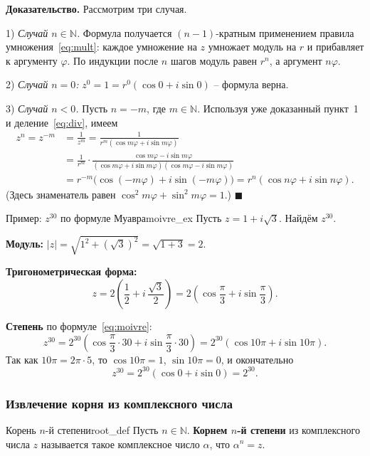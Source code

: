 \documentclass[12pt,a4paper]{article}
\newenvironment{myproof}{\noindent\textbf{Доказательство.}}{\hfill$\blacksquare$}
\begin{document}
\begin{myproof}
  Рассмотрим три случая.

1) \textit{Случай $n \in \mathbb{N}$.} Формула получается
$(n-1)$-кратным применением правила умножения~\eqref{eq:mult}: каждое
умножение на $z$ умножает модуль на $r$ и прибавляет к аргументу
$\varphi$. По индукции после $n$ шагов модуль равен $r^n$, а аргумент
$n\varphi$.

2) \textit{Случай $n = 0$:} $z^0 = 1 = r^0(\cos 0 + i\sin 0)$ --
формула верна.

3) \textit{Случай $n < 0$.} Пусть $n = -m$, где $m \in \mathbb{N}$.
Используя уже доказанный пункт~1 и деление~\eqref{eq:div}, имеем
\begin{align*}
z^n = z^{-m} &= \frac{1}{z^m}
= \frac{1}{r^m(\cos m\varphi + i\sin m\varphi)} \\
&= \frac{1}{r^m} \cdot
\frac{\cos m\varphi - i\sin m\varphi}
{(\cos m\varphi + i\sin m\varphi)(\cos m\varphi - i\sin m\varphi)} \\
&= r^{-m}\bigl(\cos(-m\varphi) + i\sin(-m\varphi)\bigr)
= r^n(\cos n\varphi + i\sin n\varphi).
\end{align*}
(Здесь знаменатель равен $\cos^2 m\varphi + \sin^2 m\varphi = 1$.)
\end{myproof}

\begin{definition}{Пример: $z^{30}$ по формуле Муавра}{moivre_ex}
Пусть $z = 1 + i\sqrt{3}$. Найдём $z^{30}$.

\textbf{Модуль:} $|z| = \sqrt{1^2 + (\sqrt{3})^2} = \sqrt{1 + 3}
= 2$.

\textbf{Тригонометрическая форма:}
\[
z = 2\!\left(\frac{1}{2} + i\,\frac{\sqrt{3}}{2}\right)
= 2\!\left(\cos\frac{\pi}{3} + i\sin\frac{\pi}{3}\right).
\]

\textbf{Степень} по формуле~\eqref{eq:moivre}:
\[
z^{30} = 2^{30}\!\left(\cos\frac{\pi}{3}\cdot 30
+ i\sin\frac{\pi}{3}\cdot 30\right)
= 2^{30}(\cos 10\pi + i\sin 10\pi).
\]
Так как $10\pi = 2\pi \cdot 5$, то $\cos 10\pi = 1$,
$\sin 10\pi = 0$, и окончательно
\[
z^{30} = 2^{30}(\cos 0 + i\sin 0) = 2^{30}.
\]
\end{definition}

\subsubsection*{Извлечение корня из комплексного числа}

\begin{definition}{Корень $n$-й степени}{root_def}
Пусть $n \in \mathbb{N}$. \textbf{Корнем $n$-й степени} из
комплексного числа $z$ называется такое комплексное число $\alpha$,
что $\alpha^n = z$.
\end{definition}
\end{document}
